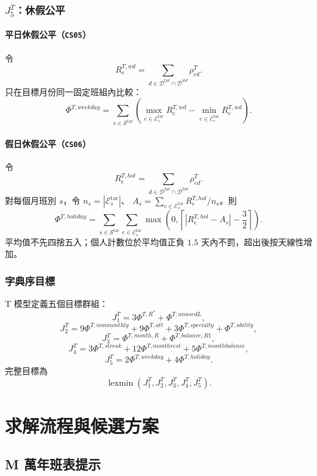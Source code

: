 \documentclass[a4paper,12pt]{article}
\begin{document}
\subsubsection{\texorpdfstring{$J^T_5$}{J5}：休假公平}

\paragraph{平日休假公平（\texttt{CS05}）}
令
\[
  R^{T,wd}_{e}
  =
  \sum_{d\in\mathcal{D}^{\mathrm{tar}}\cap\mathcal{D}^{wd}}
  \rho^{T}_{ed}.
\]
只在目標月份同一固定班組內比較：
\[
  \Phi^{T,weekday}
  =
  \sum_{s\in\mathcal{S}^{\mathrm{tar}}}
  \left(
    \max_{e\in\mathcal{E}^{\mathrm{tar}}_s}R^{T,wd}_{e}
    -
    \min_{e\in\mathcal{E}^{\mathrm{tar}}_s}R^{T,wd}_{e}
  \right).
\]

\paragraph{假日休假公平（\texttt{CS06}）}
令
\[
  R^{T,hol}_{e}
  =
  \sum_{d\in\mathcal{D}^{\mathrm{tar}}\cap\mathcal{D}^{hol}}
  \rho^{T}_{ed}.
\]
對每個月班別 $s$，令 $n_s=|\mathcal E^{\mathrm{tar}}_s|$、
$A_s=\sum_{e\in\mathcal E^{\mathrm{tar}}_s}R^{T,hol}_e/n_s$。則
\[
  \Phi^{T,holiday}
  =
  \sum_{s\in\mathcal{S}^{\mathrm{tar}}}
  \sum_{e\in\mathcal E^{\mathrm{tar}}_s}
  \max\left(0,
    \left\lceil |R^{T,hol}_e-A_s|-\frac{3}{2}\right\rceil
  \right).
\]
平均值不先四捨五入；個人計數位於平均值正負 $1.5$ 天內不罰，超出後按天線性增加。

\subsubsection{字典序目標}

T 模型定義五個目標群組：
\[
  J^T_1=3\Phi^{T,R^*}+\Phi^{T,unusedL},
\]
\[
  J^T_2
  =
  9\Phi^{T,nonmonthly}
  +9\Phi^{T,att}
  +3\Phi^{T,specialty}
  +\Phi^{T,ability},
\]
\[
  J^T_3
  =
  \Phi^{T,month,R}
  +\Phi^{T,balance,R1},
\]
\[
  J^T_4
  =
  3\Phi^{T,streak}
  +12\Phi^{T,monthrest}
  +5\Phi^{T,monthbalance},
\]
\[
  J^T_5
  =
  2\Phi^{T,weekday}
  +4\Phi^{T,holiday}.
\]
完整目標為
\[
  \operatorname{lexmin}
  \left(J^T_1,J^T_2,J^T_3,J^T_4,J^T_5\right).
\]

\section{求解流程與候選方案}

\subsection{M 萬年班表提示}
\end{document}
